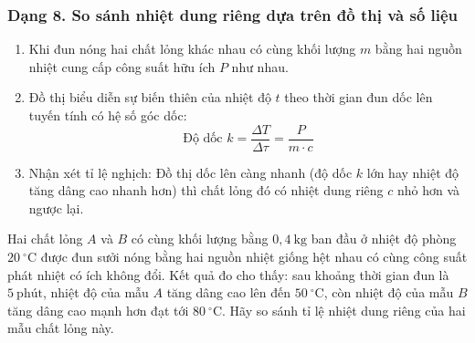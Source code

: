 \subsubsection{Dạng 8. So sánh nhiệt dung riêng dựa trên đồ thị và số liệu}

\begin{phuongphap}
\begin{enumerate}
\item Khi đun nóng hai chất lỏng khác nhau có cùng khối lượng $m$ bằng hai nguồn nhiệt cung cấp công suất hữu ích $P$ như nhau.
\item Đồ thị biểu diễn sự biến thiên của nhiệt độ $t$ theo thời gian đun dốc lên tuyến tính có hệ số góc dốc:
\[
\text{Độ dốc } k = \dfrac{\Delta T}{\Delta \tau} = \dfrac{P}{m \cdot c}
\]
\item Nhận xét tỉ lệ nghịch: Đồ thị dốc lên càng nhanh (độ dốc $k$ lớn hay nhiệt độ tăng dâng cao nhanh hơn) thì chất lỏng đó có nhiệt dung riêng $c$ nhỏ hơn và ngược lại.
\end{enumerate}
\end{phuongphap}
\begin{vidumau}
Hai chất lỏng $A$ và $B$ có cùng khối lượng bằng $0{,}4\ \mathrm{kg}$ ban đầu ở nhiệt độ phòng $20\ ^\circ\mathrm{C}$ được đun sưởi nóng bằng hai nguồn nhiệt giống hệt nhau có cùng công suất phát nhiệt có ích không đổi. Kết quả đo cho thấy: sau khoảng thời gian đun là $5\ \mathrm{phút}$, nhiệt độ của mẫu $A$ tăng dâng cao lên đến $50\ ^\circ\mathrm{C}$, còn nhiệt độ của mẫu $B$ tăng dâng cao mạnh hơn đạt tới $80\ ^\circ\mathrm{C}$. Hãy so sánh tỉ lệ nhiệt dung riêng của hai mẫu chất lỏng này.
\end{vidumau}

